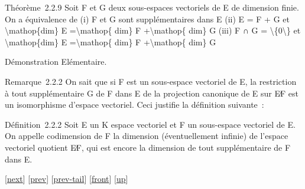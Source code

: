 \documentclass[]{article}
\begin{document}
Théorème~2.2.9 Soit F et G deux sous-espaces vectoriels de E de
dimension finie. On a équivalence de (i) F et G sont supplémentaires
dans E (ii) E = F + G et \textbackslash{}mathop\{dim\} E
=\textbackslash{}mathop\{ dim\} F +\textbackslash{}mathop\{ dim\} G
(iii) F ∩ G = \textbackslash{}\{0\textbackslash{}\} et
\textbackslash{}mathop\{dim\} E =\textbackslash{}mathop\{ dim\} F
+\textbackslash{}mathop\{ dim\} G

Démonstration Elémentaire.

Remarque~2.2.2 On sait que si F est un sous-espace vectoriel de E, la
restriction à tout supplémentaire G de F dans E de la projection
canonique de E sur E∕F est un isomorphisme d'espace vectoriel. Ceci
justifie la définition suivante~:

Définition~2.2.2 Soit E un K espace vectoriel et F un sous-espace
vectoriel de E. On appelle codimension de F la dimension (éventuellement
infinie) de l'espace vectoriel quotient E∕F, qui est encore la dimension
de tout supplémentaire de F dans E.

{[}\href{coursse9.html}{next}{]} {[}\href{coursse7.html}{prev}{]}
{[}\href{coursse7.html\#tailcoursse7.html}{prev-tail}{]}
{[}\href{coursse8.html}{front}{]}
{[}\href{coursch3.html\#coursse8.html}{up}{]}
\end{document}
